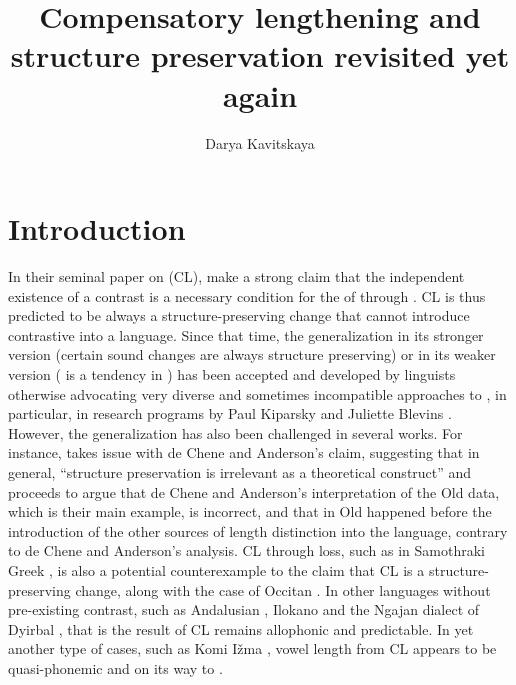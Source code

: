 \documentclass[output=paper,
modfonts
]{LSP/langsci}
\title{Compensatory lengthening and structure preservation revisited yet again}
\author{%
Darya Kavitskaya\affiliation{University of California, Berkeley}
}
\begin{document}
\maketitle



\section{Introduction}

In their seminal paper on  (CL), \citet{deChene1979} make a strong claim that the independent existence of a
 contrast is a necessary condition for the 
of  through . CL is thus predicted to be always a structure-preserving change
that cannot introduce contrastive  into a language. Since
that time, the generalization in its stronger version (certain sound
changes are always structure preserving) or in its weaker version
( is a tendency in ) has been accepted
and developed by linguists otherwise advocating very diverse and
sometimes incompatible approaches to , in particular, in
research programs by Paul Kiparsky \citep{kiparsky1995,kiparsky2003} and Juliette
Blevins \citep{blevins2004a,blevins2009k}. However, the generalization has also been
challenged in several works. For instance, \citet{gess1998} takes issue with
de Chene and Anderson's claim, suggesting that in general, ``structure
preservation is irrelevant as a theoretical construct'' and proceeds to
argue that de Chene and Anderson's interpretation of the Old 
data, which is their main example, is incorrect, and that in Old 
 happened before the introduction of the other
sources of length distinction into the language, contrary to de Chene
and Anderson's analysis. CL through  loss,
such as in Samothraki Greek \citep{topintzi2006k,kiparsky2011k,katsika2015}, is also a potential counterexample to the claim that
CL is a structure-preserving change, along with the case of Occitan
\citep{morin1992}. In other languages without pre-existing 
contrast, such as Andalusian  \citep{hock1986k}, Ilokano \citep{hayes1989k}
and the Ngajan dialect of Dyirbal \citep{dixon1990},  that is the
result of CL remains allophonic and predictable. In yet another type of
cases, such as Komi Ižma \citep{harms1967,harms1968,hausenberg1998}, vowel
length from CL appears to be quasi-phonemic and on its way to
.
\end{document}
